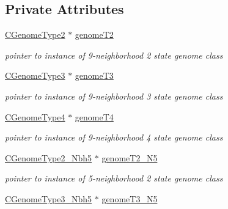 \subsection*{Private Attributes}
\begin{DoxyCompactItemize}
\item 
\hypertarget{classCGenome_a0185d3a35d45671def9b0c6cf4b99813}{
\hyperlink{classCGenomeType2}{CGenomeType2} $\ast$ \hyperlink{classCGenome_a0185d3a35d45671def9b0c6cf4b99813}{genomeT2}}
\label{classCGenome_a0185d3a35d45671def9b0c6cf4b99813}

\begin{DoxyCompactList}\small\item\em pointer to instance of 9-\/neighborhood 2 state genome class \item\end{DoxyCompactList}\item 
\hypertarget{classCGenome_a515fe0a4fc4791e9982d05b323140b6e}{
\hyperlink{classCGenomeType3}{CGenomeType3} $\ast$ \hyperlink{classCGenome_a515fe0a4fc4791e9982d05b323140b6e}{genomeT3}}
\label{classCGenome_a515fe0a4fc4791e9982d05b323140b6e}

\begin{DoxyCompactList}\small\item\em pointer to instance of 9-\/neighborhood 3 state genome class \item\end{DoxyCompactList}\item 
\hypertarget{classCGenome_acefb847048661a389759bd7494b60e46}{
\hyperlink{classCGenomeType4}{CGenomeType4} $\ast$ \hyperlink{classCGenome_acefb847048661a389759bd7494b60e46}{genomeT4}}
\label{classCGenome_acefb847048661a389759bd7494b60e46}

\begin{DoxyCompactList}\small\item\em pointer to instance of 9-\/neighborhood 4 state genome class \item\end{DoxyCompactList}\item 
\hypertarget{classCGenome_a28e880b3c82113751e368cbcd8aa9945}{
\hyperlink{classCGenomeType2__Nbh5}{CGenomeType2\_\-Nbh5} $\ast$ \hyperlink{classCGenome_a28e880b3c82113751e368cbcd8aa9945}{genomeT2\_\-N5}}
\label{classCGenome_a28e880b3c82113751e368cbcd8aa9945}

\begin{DoxyCompactList}\small\item\em pointer to instance of 5-\/neighborhood 2 state genome class \item\end{DoxyCompactList}\item 
\hypertarget{classCGenome_a93c7227190111298e57a94300c51caad}{
\hyperlink{classCGenomeType3__Nbh5}{CGenomeType3\_\-Nbh5} $\ast$ \hyperlink{classCGenome_a93c7227190111298e57a94300c51caad}{genomeT3\_\-N5}}
\label{classCGenome_a93c7227190111298e57a94300c51caad}


\end{DoxyCompactItemize}
